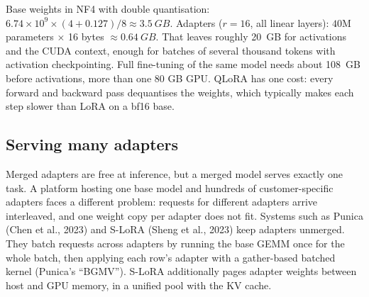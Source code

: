 \begin{napkinmath}
Base weights in NF4 with double quantisation: $6.74\times10^{9}\times(4+0.127)/8
\approx\SI{3.5}{GB}$. Adapters ($r=16$, all linear layers): $40$M parameters
$\times$ 16 bytes $\approx\SI{0.64}{GB}$. That leaves roughly \SI{20}{GB} for
activations and the CUDA context, enough for batches of several thousand tokens with
activation checkpointing. Full fine-tuning of the same model needs about
\SI{108}{GB} before activations, more than one 80 GB GPU. QLoRA has one cost: every
forward and backward pass dequantises the weights, which typically makes each step
slower than LoRA on a bf16 base.
\end{napkinmath}

\subsection{Serving many adapters}\label{sec:instruct:multilora}

Merged adapters are free at inference, but a merged model serves exactly one task. A
platform hosting one base model and hundreds of customer-specific adapters faces a
different problem: requests for different adapters arrive interleaved, and one weight
copy per adapter does not fit. Systems such as Punica (Chen et al., 2023) and S-LoRA
(Sheng et al., 2023) keep adapters unmerged. They batch requests across adapters by
running the base GEMM once for the whole batch, then applying each row's adapter with a
gather-based batched kernel (Punica's ``BGMV''). S-LoRA additionally pages adapter
weights between host and GPU memory, in a unified pool with the KV cache.

